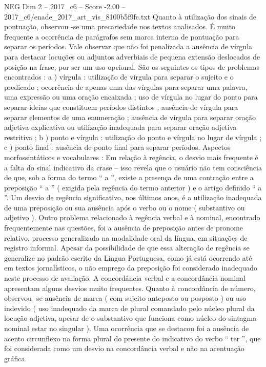\begin{textsample}{NEG Dim 2 – 2017\_c6 – Score -2.00 – 2017\_c6/enade\_2017\_art\_vis\_8100b5f9fc.txt}
Quanto à utilização dos sinais de pontuação, observou -se uma precariedade nos textos analisados.
É muito frequente a ocorrência de parágrafos sem marca interna de pontuação para separar os períodos.
Vale observar que não foi penalizada a ausência de vírgula para destacar locuções ou adjuntos adverbiais de pequena extensão deslocados de posição na frase, por ser um uso opcional.
São os seguintes os tipos de problemas encontrados : a ) vírgula : utilização de vírgula para separar o sujeito e o predicado ; ocorrência de apenas uma das vírgulas para separar uma palavra, uma expressão ou uma oração encaixada ; uso de vírgula no lugar do ponto para separar ideias que constituem períodos distintos ; ausência de vírgula para separar elementos de uma enumeração ; ausência de vírgula para separar oração adjetiva explicativa ou utilização inadequada para separar oração adjetiva restritiva ; b ) ponto e vírgula : utilização do ponto e vírgula no lugar de vírgula ; c ) ponto final : ausência de ponto final para separar períodos.
Aspectos morfossintáticos e vocabulares : Em relação à regência, o desvio mais frequente é a falta do sinal indicativo da crase – isso revela que o usuário não tem consciência de que, sob a forma do termo “ a ”, existe a presença de uma contração entre a preposição “ a ” ( exigida pela regência do termo anterior ) e o artigo definido “ a ”.
Um desvio de regência significativo, nos últimos anos, é a utilização inadequada de uma preposição ou sua ausência após o verbo ou o nome ( substantivo ou adjetivo ).
Outro problema relacionado à regência verbal e à nominal, encontrado frequentemente nas questões, foi a ausência de preposição antes de pronome relativo, processo generalizado na modalidade oral da língua, em situações de registro informal.
Apesar da possibilidade de que essa alteração de regência se generalize no padrão escrito da Língua Portuguesa, como já está ocorrendo até em textos jornalísticos, o não emprego da preposição foi considerado inadequado neste processo de avaliação.
A concordância verbal e a concordância nominal apresentam alguns desvios muito frequentes.
Quanto à concordância de número, observou -se ausência de marca ( com sujeito anteposto ou posposto ) ou uso indevido ( uso inadequado da marca de plural comandado pelo núcleo plural da locução adjetiva, apesar de o substantivo que funciona como núcleo do sintagma nominal estar no singular ).
Uma ocorrência que se destacou foi a ausência de acento circunflexo na forma plural do presente do indicativo do verbo “ ter ”, que foi considerada como um desvio na concordância verbal e não na acentuação gráfica.

\end{textsample}
